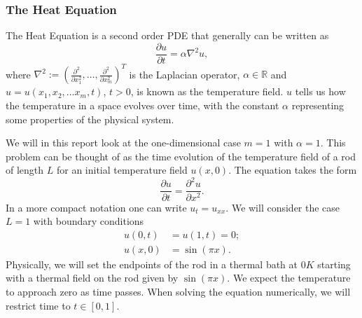 \documentclass[aps,reprint,superscriptaddress,nofootinbib]{revtex4-2}
\begin{document}
\subsubsection{The Heat Equation} 
    
    The Heat Equation is a second order PDE that generally can be written as  
    \begin{equation} \label{eq:heat_general}
        \frac{\partial u}{\partial t} = \alpha \nabla^2 u,
    \end{equation}
    where \(\nabla^2:=(\frac{\partial^2}{\partial x_1^2},\ldots,\frac{\partial^2}{\partial x_m^2})^T\) is the Laplacian operator, \(\alpha \in \mathbb{R}\) and \(u = u(x_1, x_2, ... x_m, t)\), \(t>0\), is known as the temperature field. \(u\) tells us how the temperature in a space evolves over time, with the constant \(\alpha\) representing some properties of the physical system. 
    
    We will in this report look at the one-dimensional case \(m=1\) with \(\alpha = 1\).
    This problem can be thought of as the time evolution of the temperature field of a rod of length \(L\) for an initial temperature field \(u(x, 0)\). 
    The equation takes the form %
    \begin{equation} \label{eq:heat}
        \frac{\partial u}{\partial t} = \frac{\partial^2 u}{\partial x^2}.
    \end{equation}
    In a more compact notation one can write \(u_t = u_{xx}\).
    We will consider the case \(L=1\) with boundary conditions %
    \begin{align} 
        u(0, t) &= u(1, t) = 0; \\
        u(x, 0) &= \sin{(\pi x)}. \label{eq:custom_cond}
    \end{align}
    Physically, we will set the endpoints of the rod in a thermal bath at \(0K\) starting with a thermal field %
    on the rod given by \(\sin(\pi x)\). We expect the temperature to approach zero as time passes. When solving the equation numerically, we will restrict time to \(t\in[0,1]\). %
\end{document}
